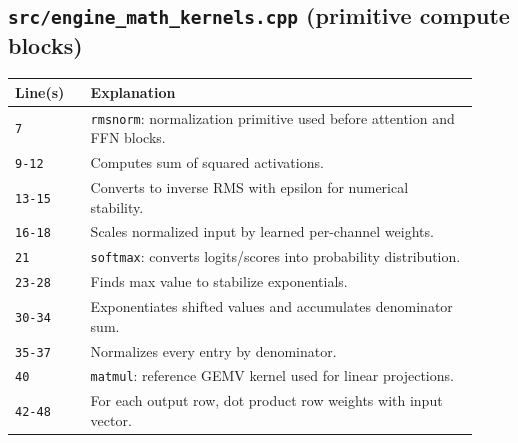 \documentclass[11pt]{article}
\begin{document}
\subsection{\texttt{src/engine\_math\_kernels.cpp} (primitive compute blocks)}
\begin{longtable}{p{0.15\linewidth} p{0.77\linewidth}}
\toprule
\textbf{Line(s)} & \textbf{Explanation} \\
\midrule
\endhead
\texttt{7} & \texttt{rmsnorm}: normalization primitive used before attention and FFN blocks. \\
\texttt{9-12} & Computes sum of squared activations. \\
\texttt{13-15} & Converts to inverse RMS with epsilon for numerical stability. \\
\texttt{16-18} & Scales normalized input by learned per-channel weights. \\
\texttt{21} & \texttt{softmax}: converts logits/scores into probability distribution. \\
\texttt{23-28} & Finds max value to stabilize exponentials. \\
\texttt{30-34} & Exponentiates shifted values and accumulates denominator sum. \\
\texttt{35-37} & Normalizes every entry by denominator. \\
\texttt{40} & \texttt{matmul}: reference GEMV kernel used for linear projections. \\
\texttt{42-48} & For each output row, dot product row weights with input vector. \\
\bottomrule
\end{longtable}
\end{document}
